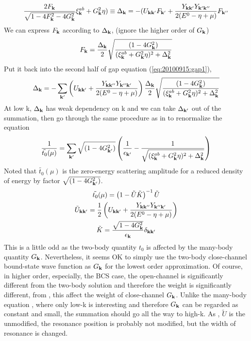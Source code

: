 \begin{equation}\label{eq:20100915:gap1}
\frac{2F_{\mathbf{k}}}{\sqrt{1-4 F_{\mathbf{k}}^2-4 G_{\mathbf{k}}^2}} \xi^{ab}_{\mathbf{k}}+  G_{\mathbf{k}}^2\eta)\equiv\Delta_{\mathbf{k}}=-(U_{\mathbf{k}\mathbf{k}'}F_{\mathbf{k}'}+\frac{Y_{\mathbf{k}\mathbf{k}'}Y_{\mathbf{k}'\mathbf{k}''}}{2(E^{0}-\eta+\mu)}F_{\mathbf{k}''}
\end{equation}
We can express $F_{\mathbf{k}}$ according to $\Delta_{\mathbf{k}}$,  (ignore the higher order of $G_{\mathbf{k}}$)
\begin{equation}
F_{\mathbf{k}}=\frac{\Delta_{\mathbf{k}}}2\sqrt{\frac{(1-4G_{\mathbf{k}}^{2})}{(\xi^{ab}_{\mathbf{k}}+  G_{\mathbf{k}}^2\eta)^{2}+\Delta_{\mathbf{k}}^{2}}}
\end{equation}
Put it back into the second half of gap equation (\ref{eq:20100915:gap1}), 
\begin{equation}\label{eq:20100915:onechannel}
\Delta_{\mathbf{k}}=-\sum_{\mathbf{k}'}\left(U_{\mathbf{k}\mathbf{k}'}+\frac{Y_{\mathbf{k}\mathbf{k}''}Y_{\mathbf{k}''\mathbf{k}'}}{2(E^{0}-\eta+\mu)}\right)\frac{\Delta_{\mathbf{k}}}2\sqrt{\frac{(1-4G_{\mathbf{k}}^{2})}{(\xi^{ab}_{\mathbf{k}}+  G_{\mathbf{k}}^2\eta)^{2}+\Delta_{\mathbf{k}}^{2}}}
\end{equation}
At low k, $\Delta_{\mathbf{k}}$ has weak dependency on k and we can take $\Delta_{\mathbf{k}'}$ out of the summation,  then go through the same procedure as in \cite{Leggett,Fetter} to renormalize the equation
\begin{equation}\label{eq:20100915:renormGap}
\frac{1}{\tilde{t_{0}}(\mu)}=\sum_{\mathbf{k}'}\sqrt{(1-4G_{\mathbf{k}'}^{2})}
\left(\frac{1}{\epsilon_{\mathbf{k}'}}-\frac{1}{\sqrt{{(\xi^{ab}_{\mathbf{k}}+  G_{\mathbf{k}}^2\eta)^{2}+\Delta_{\mathbf{k}}^{2}}}}\right)
\end{equation}
Noted that $\tilde{t_{0}}(\mu)$ is the zero-energy scattering amplitude for a reduced density of energy by factor $\sqrt{(1-4G_{\mathbf{k}'}^{2})}$.  
\begin{gather}
\tilde{t_{0}}(\mu)=\left(1-\tilde{U}\tilde{ K}\right)^{-1}\tilde{U}\label{eq:20100915:t0}\\
\tilde{U}_{\mathbf{k}\mathbf{k}'}=\frac{1}{2} \left(U_{\mathbf{k}\mathbf{k}'}+\frac{Y_{\mathbf{k}\mathbf{k}''}Y_{\mathbf{k}''\mathbf{k}'}}{2(E^{0}-\eta+\mu)}\right)\label{eq:20100915:tu}\\
\tilde{K}=\frac{\sqrt{1-4G_{\mathbf{k}}^{2}}}{\epsilon_{\mathbf{k}}}\delta_{\mathbf{k}\mathbf{k}'}\label{eq:20100915:tk}
\end{gather}
This is a little odd as the two-body quantity $t_{0}$ is affected by the many-body quantity $G_{\mathbf{k}}$.  Nevertheless, it seems OK to simply use the two-body close-channel bound-state wave function as $G_{\mathbf{k}}$ for the lowest order approximation.   Of course, in higher order, especially, the BCS case, the open-channel is significantly different from the two-body solution and therefore the weight is significantly different, from , this affect the weight of close-channel $G_{\mathbf{k}}$.  Unlike the many-body equation , where only low-k is interesting and therefore $G_{\mathbf{k}}$ can be regarded as constant and small, the summation should go all the way to high-k.  As , $\tilde{U}$ is the unmodified, the resonance position is probably not modified, but the width of resonance is changed.  



